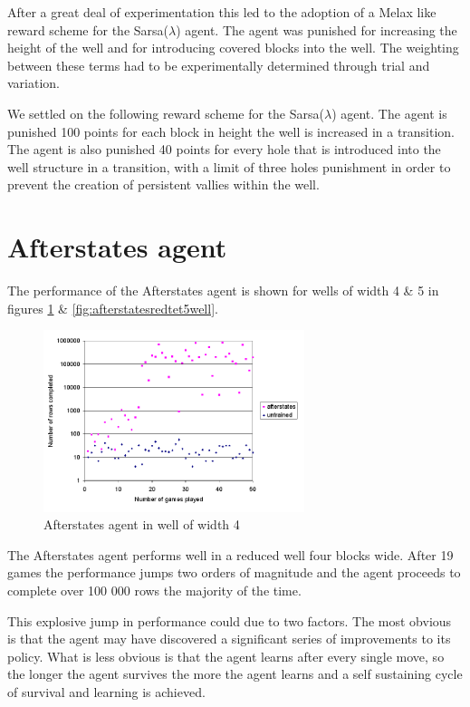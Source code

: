 \documentclass{rucsthesis}
\begin{document}
After a great deal of experimentation this led to the adoption of a Melax like reward scheme for the Sarsa($\lambda$) agent. The agent was punished for increasing the height of the well and for introducing covered blocks into the well. The weighting between these terms had to be experimentally determined through trial and variation.

We settled on the following reward scheme for the Sarsa($\lambda$) agent. The agent is punished 100 points for each block in height the well is increased in a transition. The agent is also punished 40 points for every hole that is introduced into the well structure in a transition, with a limit of three holes punishment in order to prevent the creation of persistent vallies within the well.

\section{Afterstates agent}

The performance of the Afterstates agent is shown for wells of width 4 \& 5 in figures \ref{fig:afterstatesredtet4well} \& \ref{fig:afterstatesredtet5well}.

\begin{figure}[h]
\centering
\includegraphics[width=3in]{afterstatesredtet4well.png}
\caption{Afterstates agent in well of width 4}
\label{fig:afterstatesredtet4well}
\end{figure}

The Afterstates agent performs well in a reduced well four blocks wide. After 19 games the performance jumps two orders of magnitude and the agent proceeds to complete over 100 000 rows the majority of the time. 

This explosive jump in performance could due to two factors. The most obvious is that the agent may have discovered a significant series of improvements to its policy. What is less obvious is that the agent learns after every single move, so the longer the agent survives the more the agent learns and a self sustaining cycle of survival and learning is achieved.
\end{document}
